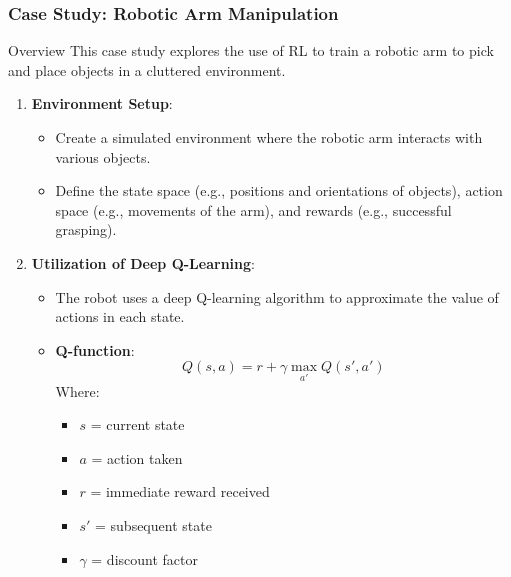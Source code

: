 \documentclass[aspectratio=169]{beamer}
\begin{document}
\begin{frame}[fragile]
    \frametitle{Case Study: Robotic Arm Manipulation}
    \begin{block}{Overview}
        This case study explores the use of RL to train a robotic arm to pick and place objects in a cluttered environment.
    \end{block}
    
    \begin{enumerate}
        \item \textbf{Environment Setup}:
            \begin{itemize}
                \item Create a simulated environment where the robotic arm interacts with various objects.
                \item Define the state space (e.g., positions and orientations of objects), action space (e.g., movements of the arm), and rewards (e.g., successful grasping).
            \end{itemize}
        
        \item \textbf{Utilization of Deep Q-Learning}:
            \begin{itemize}
                \item The robot uses a deep Q-learning algorithm to approximate the value of actions in each state.
                \item \textbf{Q-function}:
                \begin{equation}
                Q(s, a) = r + \gamma \max_{a'} Q(s', a')
                \end{equation}
                Where:
                \begin{itemize}
                    \item $s$ = current state
                    \item $a$ = action taken
                    \item $r$ = immediate reward received
                    \item $s'$ = subsequent state
                    \item $\gamma$ = discount factor
                \end{itemize}
            \end{itemize}
    \end{enumerate}
\end{frame}
\end{document}
